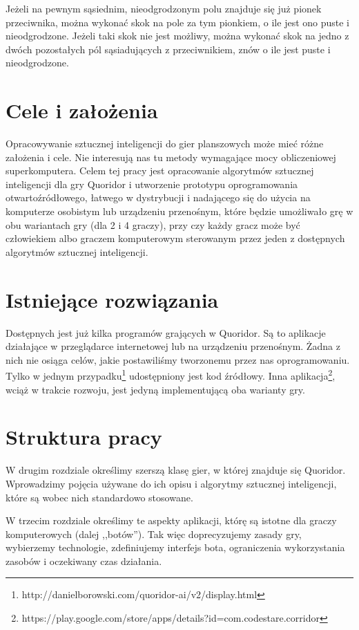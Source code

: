 \documentclass{pracamgr}
\begin{document}
Jeżeli na pewnym sąsiednim, nieodgrodzonym polu znajduje się już pionek przeciwnika, można wykonać skok na pole za tym pionkiem, o ile jest ono puste i nieodgrodzone. Jeżeli taki skok nie jest możliwy, można wykonać skok na jedno z dwóch pozostałych pól sąsiadujących z przeciwnikiem, znów o ile jest puste i nieodgrodzone.

\section{Cele i założenia}

Opracowywanie sztucznej inteligencji do gier planszowych może mieć różne założenia i cele.
Nie interesują nas tu metody wymagające mocy obliczeniowej superkomputera.
Celem tej pracy jest opracowanie algorytmów sztucznej inteligencji dla gry Quoridor i utworzenie prototypu oprogramowania otwartoźródłowego, łatwego w dystrybucji i nadającego się do użycia na komputerze osobistym lub urządzeniu przenośnym, które będzie umożliwało grę w obu wariantach gry (dla 2 i 4 graczy), przy czy każdy gracz może być człowiekiem albo graczem komputerowym sterowanym przez jeden z dostępnych algorytmów sztucznej inteligencji.

\section{Istniejące rozwiązania}

Dostępnych jest już kilka programów grających w Quoridor. Są to aplikacje działające w przeglądarce internetowej lub na urządzeniu przenośnym. Żadna z nich nie osiąga celów, jakie postawiliśmy tworzonemu przez nas oprogramowaniu.
Tylko w jednym przypadku\footnote{http://danielborowski.com/quoridor-ai/v2/display.html} udostępniony jest kod źródłowy.
Inna aplikacja\footnote{https://play.google.com/store/apps/details?id=com.codestare.corridor}, wciąż w trakcie rozwoju, jest jedyną implementującą oba warianty gry.

\section{Struktura pracy}

W drugim rozdziale określimy szerszą klasę gier, w której znajduje się Quoridor.
Wprowadzimy pojęcia używane do ich opisu i algorytmy sztucznej inteligencji, które są wobec nich standardowo stosowane.

W trzecim rozdziale określimy te aspekty aplikacji, którę są istotne dla graczy komputerowych (dalej ,,botów'').
Tak więc doprecyzujemy zasady gry, wybierzemy technologie, zdefiniujemy interfejs bota, ograniczenia wykorzystania zasobów i oczekiwany czas działania.
\end{document}

